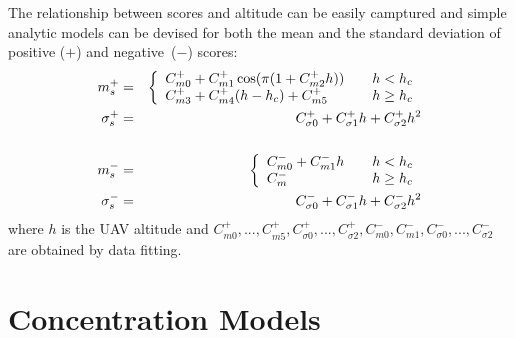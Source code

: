 \documentclass[a4paper,11pt]{report}
\begin{document}
The relationship between scores and altitude  can be easily camptured and simple analytic models can be devised for both the mean and the standard deviation of positive ($+$) and negative~($-$) scores:
\begin{eqnarray}
m^{+}_s &=& 
\left\{ 
\begin{array}{l l}
C^{+}_{m 0} + C^{+}_{m 1} \cos (\pi (1 + C^{+}_{m 2} h))  & \quad h<h_c \\
C^{+}_{m 3} +  C^{+}_{m 4} (h - h_c) + C^{+}_{m 5} & \quad h \geq h_c
\end{array}
\right.
\\
\sigma^{+}_s &=& C^{+}_{\sigma 0} + C^{+}_{\sigma 1} h+ C^{+}_{\sigma 2} h^2
\\ \nonumber
\\ 
m^{-}_s &=&
\left\{ 
\begin{array}{l l}
C^{-}_{m 0} + C^{-}_{m 1} h & \quad h<h_c \\
C^{-}_{m} & \quad h \geq h_c
\end{array}
\right.
\\
\sigma^{-}_s &=& C^{-}_{\sigma 0} + C^{-}_{\sigma 1} h+ C^{-}_{\sigma 2} h^2
\end{eqnarray}
where $h$ is the UAV altitude and $C^{+}_{m 0},...,C^{+}_{m 5},C^{+}_{\sigma 0},...,C^{+}_{\sigma 2},C^{-}_{m 0},C^{-}_{m 1},C^{-}_{\sigma 0},...,C^{-}_{\sigma 2}$ are obtained by data fitting.


\newpage

\section{Concentration Models}
\end{document}
